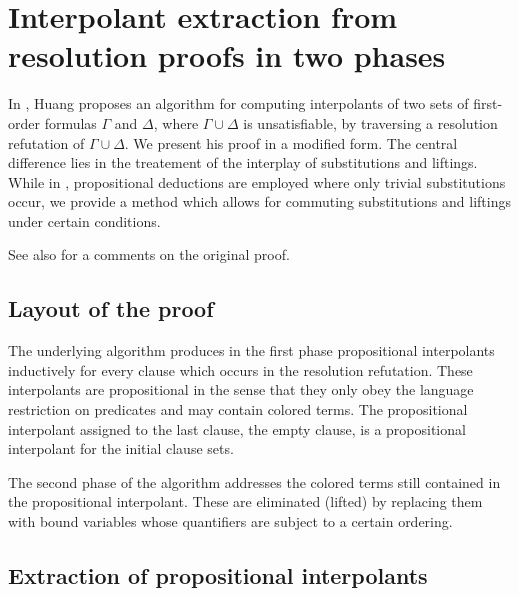 \chapter{Interpolant extraction from resolution proofs in two phases}

In \cite{Huang95}, Huang proposes an algorithm for computing interpolants of two sets of first-order formulas $\Gamma$ and $\Delta$, where $\Gamma\cup\Delta$ is unsatisfiable, by traversing a resolution refutation of $\Gamma \cup \Delta$.
We present his proof in a modified form.
The central difference lies in the treatement of the interplay of substitutions and liftings. While in \cite{Huang95}, propositional deductions are employed where only trivial substitutions occur, we provide a method which allows for commuting substitutions and liftings under certain conditions.

See also \mytodo{} for a comments on the original proof.

\section{Layout of the proof}

The underlying algorithm produces in the first phase propositional interpolants inductively for every clause which occurs in the resolution refutation.
These interpolants are propositional in the sense that they only obey the language restriction on predicates and may contain colored terms.
The propositional interpolant assigned to the last clause, the empty clause, is a propositional interpolant for the initial clause sets.

The second phase of the algorithm addresses the colored terms still contained in the propositional interpolant.
These are eliminated (lifted) by replacing them with bound variables whose quantifiers are subject to a certain ordering.



\section{Extraction of propositional interpolants}

